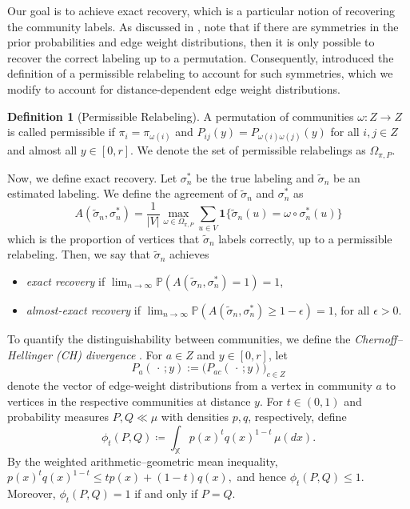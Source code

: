 \documentclass[11pt, a4paper]{amsart}
\renewcommand{\P}{\mathbb{P}}
\newcommand{\1}{\mathbf{1}}
\theoremstyle{definition}
\newtheorem{definition}[theorem]{Definition}
\theoremstyle{remark}
\theoremstyle{definition}
\begin{document}
Our goal is to achieve exact recovery, which is a particular notion of recovering the community labels. As discussed in \cite{gaudio2025incguan}, note that if there are symmetries in the prior probabilities and edge weight distributions, then it is only possible to recover the correct labeling up to a permutation. Consequently, \cite{gaudio2025incguan} introduced the definition of a permissible relabeling to account for such symmetries, which we modify to account for distance-dependent edge weight distributions. 

\begin{definition}[Permissible Relabeling]
\label{def:permissible}
A permutation of communities $\omega: Z \to Z$ is called permissible if $\pi_i = \pi_{\omega(i)}$ and $P_{ij}(y) = P_{\omega(i)\omega(j)}(y)$ for all $i, j \in Z$ and almost all $y \in [0, r]$. We denote the set of permissible relabelings as $\Omega_{\pi, P}$.
\end{definition}
Now, we define exact recovery. Let $\sigma^*_n$ be the true labeling and $\tilde{\sigma}_n$ be an estimated labeling. We define the agreement of $\tilde{\sigma}_n$ and $\sigma^*_n$ as
\begin{equation*}
    A(\tilde{\sigma}_n, \sigma^*_n) = \frac{1}{|V|} \max_{\omega \in \Omega_{\pi, P}} \sum_{u \in V} \1\{\tilde{\sigma}_n(u) = \omega \circ \sigma^*_n(u)\}
\end{equation*}
which is the proportion of vertices that $\tilde{\sigma}_n$ labels correctly, up to a permissible relabeling. Then, we say that $\tilde{\sigma}_n$ achieves
\begin{itemize}
    \item \textit{exact recovery} if $\lim_{n \to \infty} \P(A(\tilde{\sigma}_n, \sigma^*_n) = 1) = 1$,
    \item \textit{almost-exact recovery} if $\lim_{n \to \infty} \P(A(\tilde{\sigma}_n, \sigma^*_n) \geq 1 - \epsilon) = 1$, for all $\epsilon > 0$.
\end{itemize}


To quantify the distinguishability between communities, we define the
\textit{Chernoff--Hellinger (CH) divergence} \citep{abbe_2015_sbm_limits}.
For $a\in Z$ and $y\in[0,r]$, let
\[
P_a(\,\cdot\,;y)
:=
\bigl(P_{ac}(\,\cdot\,;y)\bigr)_{c\in Z}
\]
denote the vector of edge-weight distributions from a vertex in
community $a$ to vertices in the respective communities at distance
$y$. For $t\in(0,1)$ and probability measures $P,Q\ll\mu$ with
densities $p,q$, respectively, define
\begin{equation}
\label{eq:def_phi}
\phi_t(P,Q)
\coloneqq
\int_{\mathbb X} p(x)^t q(x)^{1-t}\,\mu(dx).
\end{equation}
By the weighted arithmetic--geometric mean inequality,
\(
p(x)^tq(x)^{1-t}
\leq tp(x)+(1-t)q(x),
\)
and hence $\phi_t(P,Q)\leq 1$. Moreover,
 $\phi_t(P,Q)=1$ if and only if $P=Q$. %
\end{document}
